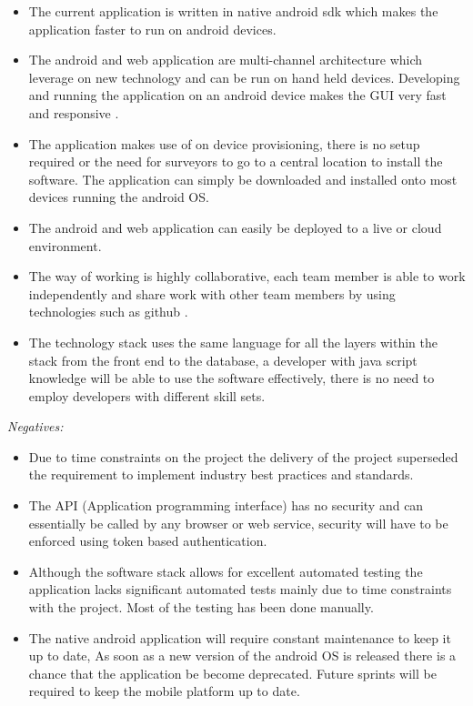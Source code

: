\documentclass[12pt]{witseiepaper}
\begin{document}
\begin{itemize}
\item The current application is written in native android sdk which makes the application faster to run on android devices. 
\item The android and web application are multi-channel architecture which leverage on new technology and can be run on hand held devices. Developing and running the application on an android device makes the GUI very fast and responsive \cite{AndroidNative}.
\item The application makes use of on device provisioning, there is no setup required or the need for surveyors to go to a central location to install the software. The application can simply be downloaded and installed onto most devices running the android OS. 
\item The android and web application can easily be deployed to a live or cloud environment. 
\item The way of working is highly collaborative, each team member is able to work independently and share work with other team members by using technologies such as github \cite{GitHub}. 
\item The technology stack uses the same language for all the layers within the stack from the front end to the database, a developer with java script knowledge will be able to use the software effectively, there is no need to employ developers with different skill sets. 
\end{itemize}

\textit{Negatives:}

\begin{itemize}
\item Due to time constraints on the project the delivery of the project superseded the requirement to implement industry best practices and standards.
\item The API (Application programming interface) has no security and can essentially be called by any browser or web service, security will have to be enforced using token based authentication.
\item Although the software stack allows for excellent automated testing the application lacks significant automated tests mainly due to time constraints with the project. Most of the testing has been done manually.
\item The native android application will require constant maintenance to keep it up to date, As soon as a new version of the android OS is released there is a chance that the application be become deprecated. Future sprints will be required to keep the mobile platform up to date. 
\end{itemize}
\end{document}
